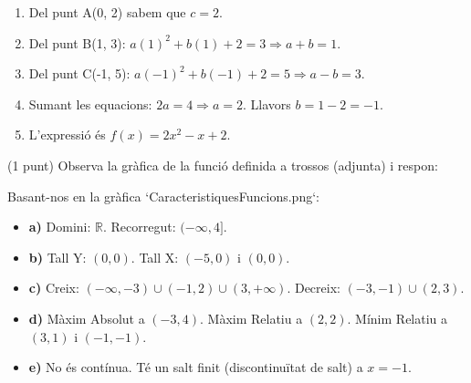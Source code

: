 \documentclass[12pt,a4paper]{exam}
\begin{document}
\begin{questions}
\begin{solution}
\begin{enumerate}
    \item Del punt A(0, 2) sabem que $c = 2$.
    \item Del punt B(1, 3): $a(1)^2 + b(1) + 2 = 3 \Rightarrow a + b = 1$.
    \item Del punt C(-1, 5): $a(-1)^2 + b(-1) + 2 = 5 \Rightarrow a - b = 3$.
    \item Sumant les equacions: $2a = 4 \Rightarrow a = 2$. Llavors $b = 1 - 2 = -1$.
    \item L'expressió és \textbf{$f(x) = 2x^2 - x + 2$}.
\end{enumerate}
\end{solution}

\question (1 punt) Observa la gràfica de la funció definida a trossos (adjunta) i respon:

\begin{solution}
Basant-nos en la gràfica `CaracteristiquesFuncions.png`:
\begin{itemize}
    \item \textbf{a)} Domini: $\mathbb{R}$. Recorregut: $(-\infty, 4]$.
    \item \textbf{b)} Tall Y: $(0, 0)$. Tall X: $(-5, 0)$ i $(0, 0)$.
    \item \textbf{c)} Creix: $(-\infty, -3) \cup (-1, 2) \cup (3, +\infty)$. Decreix: $(-3, -1) \cup (2, 3)$.
    \item \textbf{d)} Màxim Absolut a $(-3, 4)$. Màxim Relatiu a $(2, 2)$. Mínim Relatiu a $(3, 1)$ i $(-1, -1)$.
    \item \textbf{e)} No és contínua. Té un salt finit (discontinuïtat de salt) a \textbf{$x = -1$}.
\end{itemize}
\end{solution}


\end{questions}
\end{document}
